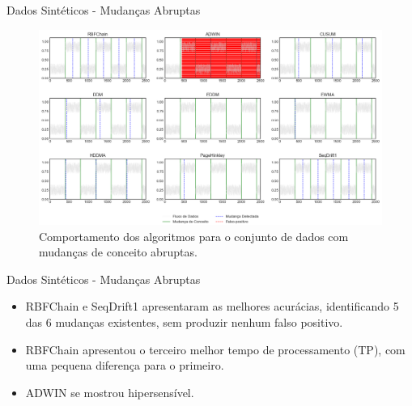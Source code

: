 \documentclass[10pt]{beamer}
\begin{document}
\begin{frame}{Dados Sintéticos -  Mudanças Abruptas}
    \begin{figure}[t]
        \begin{center}
            \includegraphics[width=\textwidth]{imagens/abrupt.png}
            \caption{Comportamento dos algoritmos para o conjunto de dados com mudanças de conceito abruptas.}
            \label{fig:exp_abrupta}
        \end{center}
    \end{figure}
\end{frame}

\begin{frame}{Dados Sintéticos -  Mudanças Abruptas}
    \begin{itemize}
        \item RBFChain e SeqDrift1 apresentaram as melhores acurácias, identificando 5 das 6 mudanças existentes, sem produzir nenhum falso positivo.
        \item RBFChain apresentou o terceiro melhor tempo de processamento (TP), com uma pequena diferença para o primeiro.
        \item ADWIN se mostrou hipersensível.
    \end{itemize}
\end{frame}
\end{document}
